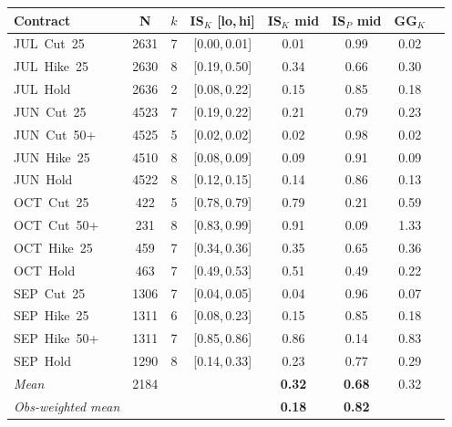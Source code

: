 \begin{tabular}{lccccccc}
\toprule
Contract & N & $k$ & IS$_{K}$ [lo,\,hi] & IS$_{K}$ mid & IS$_{P}$ mid & GG$_{K}$ \\
\midrule
JUL~Cut~25 & 2631 & 7 & [0.00,\,0.01] & 0.01 & 0.99 & 0.02 \\
JUL~Hike~25 & 2630 & 8 & [0.19,\,0.50] & 0.34 & 0.66 & 0.30 \\
JUL~Hold & 2636 & 2 & [0.08,\,0.22] & 0.15 & 0.85 & 0.18 \\
JUN~Cut~25 & 4523 & 7 & [0.19,\,0.22] & 0.21 & 0.79 & 0.23 \\
JUN~Cut~50+ & 4525 & 5 & [0.02,\,0.02] & 0.02 & 0.98 & 0.02 \\
JUN~Hike~25 & 4510 & 8 & [0.08,\,0.09] & 0.09 & 0.91 & 0.09 \\
JUN~Hold & 4522 & 8 & [0.12,\,0.15] & 0.14 & 0.86 & 0.13 \\
OCT~Cut~25 & 422 & 5 & [0.78,\,0.79] & 0.79 & 0.21 & 0.59 \\
OCT~Cut~50+ & 231 & 8 & [0.83,\,0.99] & 0.91 & 0.09 & 1.33 \\
OCT~Hike~25 & 459 & 7 & [0.34,\,0.36] & 0.35 & 0.65 & 0.36 \\
OCT~Hold & 463 & 7 & [0.49,\,0.53] & 0.51 & 0.49 & 0.22 \\
SEP~Cut~25 & 1306 & 7 & [0.04,\,0.05] & 0.04 & 0.96 & 0.07 \\
SEP~Hike~25 & 1311 & 6 & [0.08,\,0.23] & 0.15 & 0.85 & 0.18 \\
SEP~Hike~50+ & 1311 & 7 & [0.85,\,0.86] & 0.86 & 0.14 & 0.83 \\
SEP~Hold & 1290 & 8 & [0.14,\,0.33] & 0.23 & 0.77 & 0.29 \\
\midrule
\textit{Mean} & 2184 & & & \textbf{0.32} & \textbf{0.68} & 0.32 \\
\textit{Obs-weighted mean} & & & & \textbf{0.18} & \textbf{0.82} & \\
\bottomrule
\end{tabular}